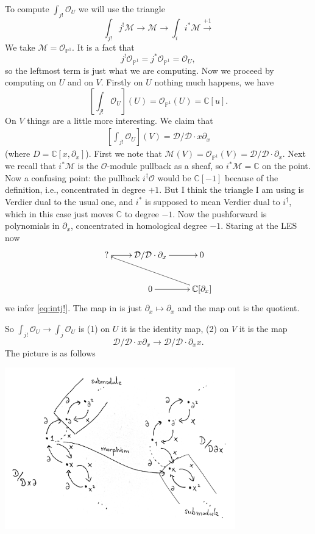 \documentclass[12pt]{article}
\theoremstyle{plain}
\theoremstyle{definition}
\numberwithin{equation}{section}
\newcommand{\C}{\mathbb{C}}
\newcommand{\bbP}{\mathbb{P}}
\newcommand{\CD}{\mathcal{D}}
\newcommand{\OO}{\mathcal{O}}
\newcommand{\CM}{\mathcal{M}}
\begin{document}
To compute $\int_{j!} \OO_U$ we will use the triangle
\[
\int_{j!} j^! \CM \rightarrow \CM \rightarrow \int_i i^* \CM \xrightarrow{+1}
\]
We take $\CM = \OO_{\bbP^1}$. It is a fact that
\[
j^! \OO_{\bbP^1} = j^* \OO_{\bbP^1} = \OO_U,
\]
so the leftmost term is just what we are computing. Now we proceed by computing on $U$ and on $V$. Firstly on $U$ nothing much happens, we have
\[
[\int_{j!}\OO_U](U) = \OO_{\bbP^1}(U) = \C[u].
\]
On $V$ things are a little more interesting. We claim that
\begin{align}\label{eq:intj!}
[\int_{j!}\OO_U](V) = \CD / \CD \cdot x \partial_x
\end{align}
(where $D = \C[x, \partial_x]$). First we note that $\CM(V) = \OO_{\bbP^1}(V) = \CD / \CD \cdot \partial_x$. Next we recall that $i^* \CM$ is the $\OO$-module pullback as a sheaf, so $i^* \CM = \C$ on the point. {\color{red}Now a confusing point: the pullback $i^\dagger \OO$ would be $\C[-1]$ because of the definition, i.e., concentrated in degree $+1$. But I think the triangle I am using is Verdier dual to the usual one, and $i^*$ is supposed to mean Verdier dual to $i^\dagger$, which in this case just moves $\C$ to degree $-1$.} Now the pushforward is polynomials in $\partial_x$, concentrated in homological degree $-1$. Staring at the LES now
\begin{align*}
\xymatrix{
? \ar@{->}[r] & \CD / \CD \cdot \partial_x \ar@{->}[r] & 0 \\
%
 & 0 \ar@{->}[r] & \C[\partial_x] \ar@{->}[ull] \\
}
\end{align*}
we infer \eqref{eq:intj!}. The map in is just $\partial_x \mapsto \partial_x$ and the map out is the quotient.

So $\int_{j!} \OO_U \rightarrow \int_j \OO_U$ is (1) on $U$ it is the identity map, (2) on $V$ it is the map
\[
\CD / \CD \cdot x \partial_x \rightarrow \CD / \CD \cdot \partial_x x.
\]
The picture is as follows

\begin{center}
\includegraphics[width=100mm]{intext_1.jpg}
\end{center}
\end{document}
